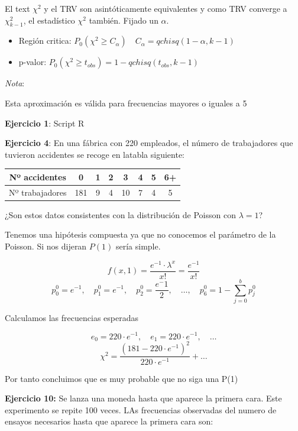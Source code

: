 El text $\chi^2$ y el TRV son asintóticamente equivalentes y como TRV converge a $\chi^2_{k-1}$, el estadístico $\chi^2$ también.
Fijado un $\alpha$.
\begin{itemize}
    \item Región critica: $P_0(\chi^2 \geq C_\alpha) \quad C_\alpha=qchisq(1-\alpha,k-1)$
    \item p-valor: $P_0(\chi^2 \geq t_{obs})=1-qchisq(t_{obs},k-1)$
\end{itemize}

\noindent \textit{Nota}:

Esta aproximación es válida para frecuencias mayores o iguales a 5

\vspace{5mm}

\textbf{Ejercicio 1}: Script R

\vspace{5mm}

\textbf{Ejercicio 4}: En una fábrica con 220 empleados, el número de trabajadores que tuvieron accidentes se recoge en latabla siguiente:

\begin{table}[!h]
    \centering
    \begin{tabular}{|c|c|c|c|c|c|c|c|}
        \hline
        {Nº accidentes} & 0 & 1 & 2 & 3 & 4 & 5 & 6+ \\ \hline
        {Nº trabajadores} & 181 & 9 & 4 & 10 & 7 & 4 & 5 \\ \hline
    \end{tabular}
\end{table}

¿Son estos datos consistentes con la distribución de Poisson con $\lambda=1$?

Tenemos una hipótesis compuesta ya que no conocemos el parámetro de la Poisson.
Si nos dijeran $P(1)$ sería simple.

\[
    f(x,1)=\frac{e^{-1}\cdot \lambda^x}{x!}=\frac{e^{-1}}{x!}
\]
\[
    p_0^0=e^{-1} ,\quad p_1^0=e^{-1} ,\quad p_2^0=\frac{e^-1}{2} ,\quad \dots,\quad p_6^0=1-\sum_{j=0}^{b}p_j^0
\]

Calculamos las frecuencias esperadas

\[
    e_0=220 \cdot e^{-1},\quad e_1=220 \cdot e^{-1}, \quad \dots
\]
\[
    \chi^2=\frac{(181-220 \cdot e^{-1})^2}{220 \cdot e^{-1}}+\dots
\]

Por tanto concluimos que es muy probable que no siga una P(1)

\textbf{Ejercicio 10:} Se lanza una moneda hasta que aparece la primera cara. Este experimento se repite 100 veces. LAs frecuencias observadas del numero de ensayos necesarios hasta que aparece la primera cara son:

